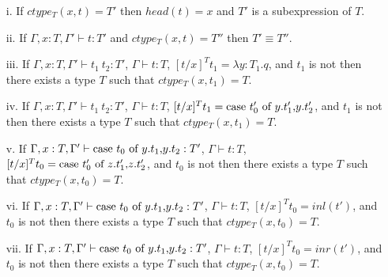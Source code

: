\begin{lemma}
  \label{lemma:ctype_props_ssfp}
  \small
  \begin{itemize}
  \item[i.] If $ctype_T(x,t) = T'$ then $head(t) = x$ and $T'$ 
    is a subexpression of $T$.
    
  \item[ii.] If $\Gamma,x:T,\Gamma' \vdash t:T'$ and $ctype_T(x,t) = T''$ then
    $T' \equiv T''$.

  \item[iii.] If $\Gamma,x:T,\Gamma' \vdash t_1\ t_2:T'$, $\Gamma \vdash t:T$,
    $[t/x]^T t_1 = \lambda y:T_1.q$, and $t_1$ is not then there exists a type
    $T$ such that $ctype_T(x,t_1) = T$.

  \item[iv.] If $\Gamma,x:T,\Gamma' \vdash t_1\ t_2:T'$, $\Gamma \vdash t:T$,
    $[t/x]^T t_1 = \mbox{case}\ t'_0\ \text{of}\ y\text{.}t'_1\text{,}y\text{.}t'_2$, and $t_1$ is not then there exists a type
    $T$ such that $ctype_T(x,t_1) = T$.

  \item[v.] If $\Gamma,x:T,\Gamma' \vdash \mbox{case}\ t_0\ \text{of}\ y\text{.}t_1\text{,}y\text{.}t_2:T'$, 
    $\Gamma \vdash t:T$, $[t/x]^T t_0 = \mbox{case}\ t'_0\ \text{of}\ z\text{.}t'_1\text{,}z\text{.}t'_2$, and 
    $t_0$ is not then there exists a type $T$ such that $ctype_T(x,t_0) = T$.

  \item[vi.] If $\Gamma,x:T,\Gamma' \vdash \mbox{case}\ t_0\ \text{of}\ y\text{.}t_1\text{,}y\text{.}t_2:T'$, 
    $\Gamma \vdash t:T$, $[t/x]^T t_0 = inl(t')$, and $t_0$ is not then there 
    exists a type $T$ such that $ctype_T(x,t_0) = T$.

  \item[vii.] If $\Gamma,x:T,\Gamma' \vdash \mbox{case}\ t_0\ \text{of}\ y\text{.}t_1\text{,}y\text{.}t_2:T'$, 
    $\Gamma \vdash t:T$, $[t/x]^T t_0 = inr(t')$, and $t_0$ is not then 
    there exists a type $T$ such that $ctype_T(x,t_0) = T$.
  \end{itemize}
\end{lemma}
